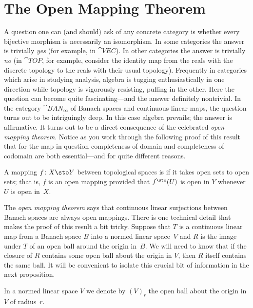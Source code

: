 \section{The Open Mapping Theorem}\label{C0694}
A question one can (and should) ask of any concrete category is whether every bijective morphism is necessarily an
isomorphism.  In some categories the answer is trivially \emph{yes} (for example, in $\cat{VEC}$).  In other
categories the answer is trivially \emph{no} (in $\cat{TOP}$, for example, consider the identity map from the
reals with the discrete topology to the reals with their usual topology).  Frequently in categories which arise in
studying analysis, algebra is tugging enthusiastically in one direction while topology is vigorously resisting, pulling
in the other.  Here the question can become quite fascinating---and the answer definitely nontrivial.  In the category
$\cat{BAN_\infty}$ of Banach spaces and continuous linear maps, the question turns out to be intriguingly deep.  In this
case algebra prevails; the answer is affirmative.  It turns out to be a direct consequence of the celebrated \emph{open
mapping theorem}.  Notice as you work through the following proof of this result that for the map in question
completeness of domain and completeness of codomain are both essential---and for quite different reasons.

\begin{defn} A mapping $f \colon X \sto Y$ between topological spaces is
 if it takes open sets to open sets; that is, $f$ is an open mapping provided that $f^{\sto}(U)$ is open in $Y$
whenever $U$ is open in~$X$.
\end{defn}

The \emph{open mapping theorem} says that continuous linear surjections between Banach spaces are always open mappings.
There is one technical detail that makes the proof of this result a bit tricky.  Suppose that $T$ is a continuous linear
map from a Banach space $B$ into a normed linear space~$V$ and $R$ is the image under $T$ of an open ball around the
origin in~$B$.  We will need to know that if the closure of $R$ contains some open ball about the origin in $V$, then
$R$ itself contains the same ball. It will be convenient to isolate this crucial bit of information in the next proposition.

\begin{notn} In a normed linear space $V$ we denote by
$(V)_r$ the open ball about the origin in $V$ of radius~$r$.
\end{notn}

